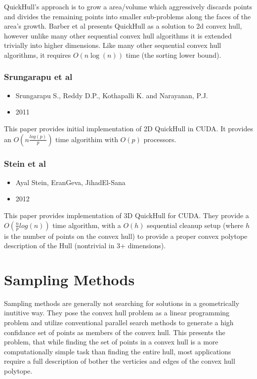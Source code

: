 \documentclass[10pt,a4paper]{report}
\begin{document}
QuickHull's approach is to grow a area/volume which aggressively discards points and divides the remaining points into smaller sub-problems along the faces of the area's growth.
Barber et al presents QuickHull as a solution to 2d convex hull, however unlike many other sequential convex hull algorithms it is extended trivially into higher dimensions.
Like many other sequential convex hull algorithms, it requires $O(n\log(n))$ time (the sorting lower bound).




\subsubsection{Srungarapu et al}
\begin{itemize}
\item{Srungarapu S., Reddy D.P., Kothapalli K. and Narayanan, P.J.}
\item{2011}
\end{itemize}
This paper provides initial implementation of 2D QuickHull in CUDA. It provides an $O(n\frac{log(p)}{p})$ time algorithim with $O(p)$ processors.


\subsubsection{Stein et al}
\begin{itemize}
\item{Ayal Stein, EranGeva, JihadEl-Sana}
\item{2012}
\end{itemize}
This paper\cite{Stein2012CudaHull} provides implementation of 3D QuickHull for CUDA. They provide a $O(\frac{n}{p}log(n))$ time algorithm, with a $O(h)$ sequential cleanup setup (where $h$ is the number of points on the convex hull) to provide a proper convex polytope description of the Hull (nontrivial in 3+ dimensions). 




\section{Sampling Methods}


Sampling methods are generally not searching for solutions in a geometrically inutitive way.
They pose the convex hull problem as a linear programming problem and utilize conventional parallel search methods to generate a high confidance set of points as members of the convex hull.
This presents the problem, that while finding the set of points in a convex hull is a more computationally simple task than finding the entire hull, most applications require a full description of bother the verticies and edges of the convex hull polytope.
\end{document}
